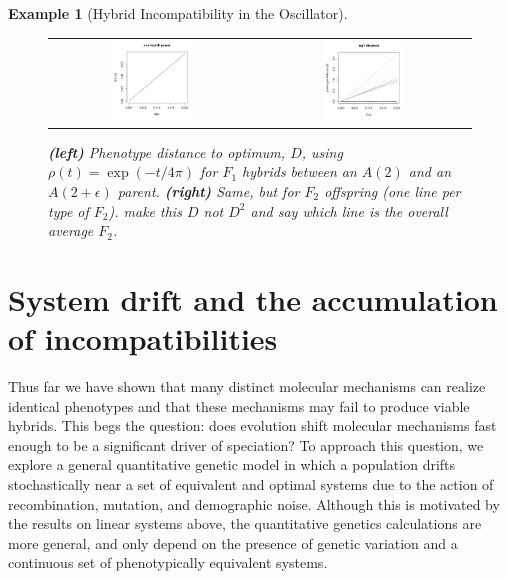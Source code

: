 \documentclass{article}
\newcommand{\plr}[1]{\todo[color=blue!25]{#1}}
\newcommand{\plri}[1]{{\color{blue}\it #1}}
\newcommand{\plr}[1]{{\color{blue}\it #1}}
\newcommand{\plri}[1]{\plr{#1}}
\newcommand{\1}{\mathbbm{1}}
\newtheorem{example}{Example}
\begin{document}
\begin{example}[Hybrid Incompatibility in the Oscillator]
  \begin{figure}[H]
  \label{fig:osc_incompat}
    \centering
    \begin{tabular}{cc}
    \includegraphics[width=0.4\textwidth]{figures/f1_quartic2} &
    \includegraphics[width=0.4\textwidth]{figures/f2_quad2}
    \end{tabular}
    \caption{
    \textbf{(left)} Phenotype distance to optimum, $D$, using $\rho(t) = \exp(-t/4\pi)$
    for $F_1$ hybrids between an $A(2)$ and an $A(2+\epsilon)$ parent.
    \textbf{(right)} Same, but for $F_2$ offspring (one line per type of $F_2$).
    \plri{make this $D$ not $D^2$ and say which line is the overall average $F_2$.}
    } \label{fig:osc_incompat}
  \end{figure}
\end{example}



\section*{System drift and the accumulation of incompatibilities}

Thus far we have shown that many distinct molecular mechanisms can realize identical phenotypes
and that these mechanisms may fail to produce viable hybrids.
This begs the question: does evolution shift molecular mechanisms
fast enough to be a significant driver of speciation?
To approach this question,
we explore a general quantitative genetic model in which a population drifts stochastically
near a set of equivalent and optimal systems
due to the action of recombination, mutation, and demographic noise.
Although this is motivated by the results on linear systems above,
the quantitative genetics calculations are more general,
and only depend on the presence of genetic variation and a continuous set of phenotypically equivalent systems.
\end{document}
